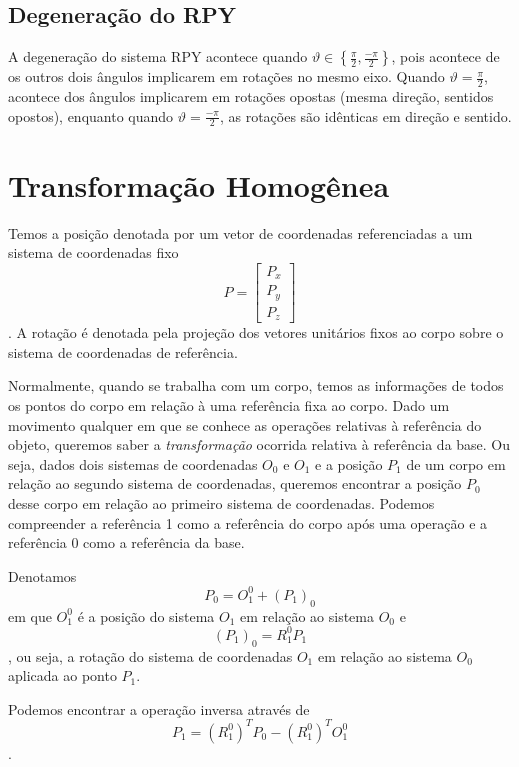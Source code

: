 
\subsection*{Degeneração do RPY}

A degeneração do sistema RPY acontece quando $\vartheta \in \left\{  \frac{\pi}{2}, \frac{-\pi}{2} \right\}$, pois acontece de os outros dois ângulos implicarem em rotações no mesmo eixo. Quando $\vartheta = \frac{\pi}{2}$, acontece dos ângulos implicarem em rotações opostas (mesma direção, sentidos opostos), enquanto quando  $\vartheta = \frac{-\pi}{2}$, as rotações são idênticas em direção e sentido.

\section*{Transformação Homogênea}

Temos a posição denotada por um vetor de coordenadas referenciadas a um sistema de coordenadas fixo  \[
P = \begin{bmatrix} P_x \\ P_y \\ P_z \end{bmatrix} 
\]. A rotação é denotada pela projeção dos vetores unitários fixos ao corpo sobre o sistema de coordenadas de referência.

Normalmente, quando se trabalha com um corpo, temos as informações de todos os pontos do corpo em relação à uma referência fixa ao corpo. Dado um movimento qualquer em que se conhece as operações relativas à referência do objeto, queremos saber a \emph{transformação} ocorrida relativa à referência da base. Ou seja, dados dois sistemas de coordenadas $O_0$ e $O_1$ e a posição $P_1$ de um corpo em relação ao segundo sistema de coordenadas, queremos encontrar a posição $P_0$ desse corpo em relação ao primeiro sistema de coordenadas. Podemos compreender a referência 1 como a referência do corpo após uma operação e a referência 0 como a referência da base.

Denotamos \[
    P_0 = O_1^{0} + (P_1)_0
\] em que $O_1^{0}$ é a posição do sistema $O_1$ em relação ao sistema $O_0$ e \[
(P_1)_0 = R_1^{0}P_1
\], ou seja, a rotação do sistema de coordenadas $O_1$ em relação ao sistema $O_0$ aplicada ao ponto $P_1$.

Podemos encontrar a operação inversa através de \[
P_1 = \left( R_1^{0}\right)^{T}P_0 - \left( R_1^{0}\right)^{T}O_1^{0}
\].

